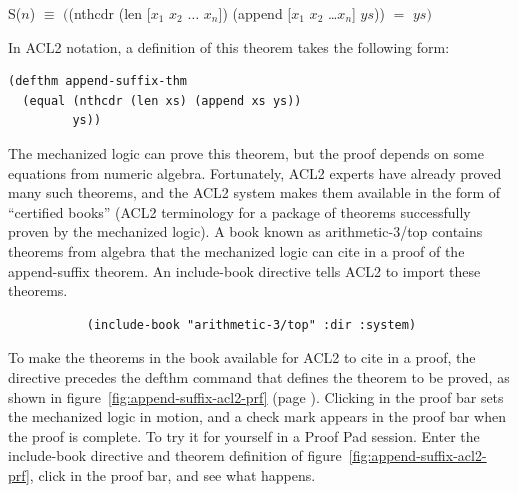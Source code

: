 \begin{samepage}
\begin{center}
S($n$) $\equiv$ $($\textsf{(nthcdr (len [$x_1$ $x_2$ $\dots$ $x_n$]) (append [$x_1$ $x_2$ \dots $x_n$] $ys$))}
$=$ $ys)$
\end{center}
\end{samepage}

In ACL2 notation, a definition of this theorem takes the following form:

\begin{code}
\begin{verbatim}
(defthm append-suffix-thm
  (equal (nthcdr (len xs) (append xs ys))
         ys))
\end{verbatim}
\end{code}

The mechanized logic can prove this theorem, but
the proof depends on some equations from numeric algebra.
Fortunately, ACL2 experts have already proved many such theorems,
and the ACL2 system makes them available in the form of
``certified books''
(ACL2 terminology for a package of theorems successfully proven by the
mechanized logic).
A book known as
\label{arith-top-book}\textsf{arithmetic-3/top}
contains theorems from algebra
that the mechanized logic can cite in
a proof of the append-suffix theorem.
An \textsf{include-book} directive tells ACL2 to
import
these theorems.
\begin{code}
\begin{verbatim}
           (include-book "arithmetic-3/top" :dir :system)
\end{verbatim}
\end{code}

To make the theorems in the book available
for ACL2 to cite in a proof,
the directive precedes the \textsf{defthm} command that
defines the theorem to be proved, as shown in
figure~\ref{fig:append-suffix-acl2-prf} (page \pageref{fig:append-suffix-acl2-prf}).
Clicking in the proof bar sets the mechanized logic in motion,
and a check mark appears in the proof bar when
the proof is complete.
To try it for yourself in a Proof Pad session.
Enter the include-book directive
and theorem definition of figure~\ref{fig:append-suffix-acl2-prf},
click in the proof bar, and see what happens.

